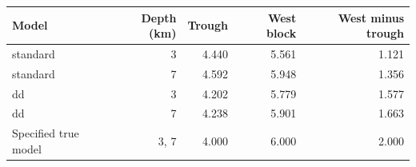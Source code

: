 \begin{tabular}{lrrrr}\toprule Model & Depth (km) & Trough & West block & West minus trough\\\midrule
standard & 3 & 4.440 & 5.561 & 1.121\\
standard & 7 & 4.592 & 5.948 & 1.356\\
dd & 3 & 4.202 & 5.779 & 1.577\\
dd & 7 & 4.238 & 5.901 & 1.663\\
Specified true model & 3, 7 & 4.000 & 6.000 & 2.000\\\bottomrule\end{tabular}
